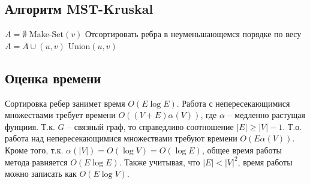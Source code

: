 \documentclass[12pt, a4paper]{article}
\begin{document}
        \subsection{Алгоритм MST-Kruskal}
            \begin{algorithmic}
            \State $A = \emptyset$
                \State Make-Set$(v)$
            \EndFor
            \State Отсортировать ребра в неуменьшающемся порядке по весу
                    \State $A = A \cup {(u, v)}$
                    \State Union$(u, v)$
                \EndIf
            \EndFor
            \end{algorithmic}

        \subsection{Оценка времени}
            Сортировка ребер занимет время $O(E\log E)$. Работа с непересекающимися множествами \cite[раздел 21.3]{clrs} требует времени $O((V+E) \alpha(V))$,
            где $\alpha$ -- медленно растущая фунциия. Т.к. $G$ -- связный граф, то справедливо соотношение $|E| \geq |V| - 1$.
            Т.о. работа над непересекающимися множествами требуют времени $O(E \alpha(V))$. Кроме того, т.к. $\alpha(|V|) = O(\log V) = O(\log E)$,
            общее время работы метода равняется $O(E\log E)$. Также учитывая, что $|E| < |V|^2$, время работы можно записать как $O(E\log V)$.
\end{document}
